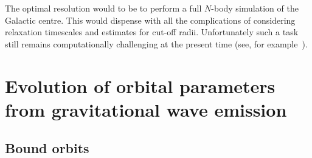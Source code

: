 \documentclass[useAMS,usedcolumn,usegraphicx,usenatbib]{mn2e}
\begin{document}
\begin{onecolumn}
The optimal resolution would to be to perform a full $N$-body simulation of the Galactic centre. This would dispense with all the complications of considering relaxation timescales and estimates for cut-off radii. Unfortunately such a task still remains computationally challenging at the present time (see, for example~\citet{Li2012}).

\section{Evolution of orbital parameters from gravitational wave emission}

\subsection{Bound orbits}


\end{onecolumn}
\end{document}
